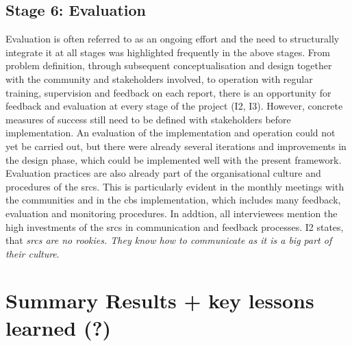 \subsection{Stage 6: Evaluation}

Evaluation is often referred to as an ongoing effort and the need to structurally integrate it at all stages was highlighted frequently in the above stages. From problem definition, through subsequent conceptualisation and design together with the community and stakeholders involved, to operation with regular training, supervision and feedback on each report, there is an opportunity for feedback and evaluation at every stage of the project (I2, I3). However, concrete measures of success still need to be defined with stakeholders before implementation. An evaluation of the implementation and operation could not yet be carried out, but there were already several iterations and improvements in the design phase, which could be implemented well with the present framework.\newline
Evaluation practices are also already part of the organisational culture and procedures of the \acrshort{srcs}. This is particularly evident in the monthly meetings with the communities and in the \acrshort{cbs} implementation, which includes many feedback, evaluation and monitoring procedures. In addtion, all interviewees mention the high investments of the \acrshort{srcs} in communication and feedback processes. I2 states, that \textit{\acrshort{srcs} are no rookies. They know how to communicate as it is a big part of their culture}.



\section{Summary Results + key lessons learned (?)}

